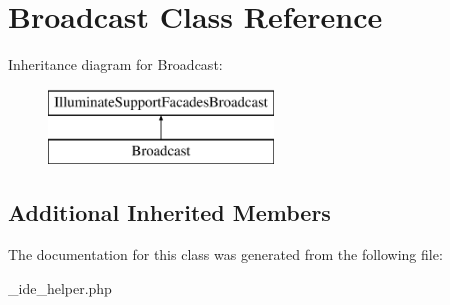 \hypertarget{class_broadcast}{}\section{Broadcast Class Reference}
\label{class_broadcast}
Inheritance diagram for Broadcast\+:\begin{figure}[H]
\begin{center}
\leavevmode
\includegraphics[height=2.000000cm]{class_broadcast}
\end{center}
\end{figure}
\subsection*{Additional Inherited Members}


The documentation for this class was generated from the following file\+:\begin{DoxyCompactItemize}
\item 
\+\_\+ide\+\_\+helper.\+php\end{DoxyCompactItemize}
